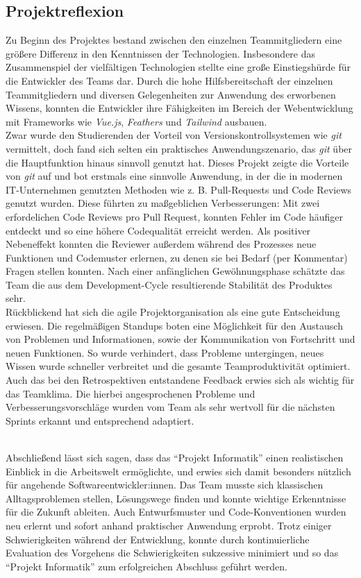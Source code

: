 \documentclass[10pt, a4paper]{article}
\begin{document}
\begin{onehalfspace}
\subsection{Projektreflexion}
Zu Beginn des Projektes bestand zwischen den einzelnen Teammitgliedern eine größere Differenz in den Kenntnissen der Technologien.
Insbesondere das Zusammenspiel der vielfältigen Technologien stellte eine große Einstiegshürde für die Entwickler des Teams dar.
Durch die hohe Hilfsbereitschaft der einzelnen Teammitgliedern und diversen Gelegenheiten zur Anwendung des erworbenen Wissens, konnten die Entwickler ihre Fähigkeiten im Bereich der Webentwicklung mit Frameworks wie \textit{Vue.js}, \textit{Feathers} und \textit{Tailwind} ausbauen.
$~$ \\
Zwar wurde den Studierenden der Vorteil von Versionskontrollsystemen wie \textit{git} vermittelt, doch fand sich selten ein praktisches Anwendungszenario, das \textit{git} über die Hauptfunktion hinaus sinnvoll genutzt hat.
Dieses Projekt zeigte die Vorteile von \textit{git} auf und bot erstmals eine sinnvolle Anwendung, in der die in modernen IT-Unternehmen genutzten Methoden wie z. B. Pull-Requests und Code Reviews genutzt wurden.
Diese führten zu maßgeblichen Verbesserungen:
Mit zwei erfordelichen Code Reviews pro Pull Request, konnten Fehler im Code häufiger entdeckt und so eine höhere Codequalität erreicht werden.
Als positiver Nebeneffekt konnten die Reviewer außerdem während des Prozesses neue Funktionen und Codemuster erlernen, zu denen sie bei Bedarf (per Kommentar) Fragen stellen konnten.
Nach einer anfänglichen Gewöhnungsphase schätzte das Team die aus dem Development-Cycle resultierende Stabilität des Produktes sehr.
\\
Rückblickend hat sich die agile Projektorganisation als eine gute Entscheidung erwiesen. Die regelmäßigen Standups boten eine Möglichkeit für den Austausch von Problemen und Informationen, sowie der Kommunikation von Fortschritt und neuen Funktionen.
So wurde verhindert, dass Probleme untergingen, neues Wissen wurde schneller verbreitet und die gesamte Teamproduktivität optimiert.
Auch das bei den Retrospektiven entstandene Feedback erwies sich als wichtig für das Teamklima.
Die hierbei angesprochenen Probleme und Verbesserungsvorschläge wurden vom Team als sehr wertvoll für die nächsten Sprints erkannt und entsprechend adaptiert.

$~$ \\
Abschließend lässt sich sagen, dass das \enquote{Projekt Informatik} einen realistischen Einblick in die Arbeitswelt ermöglichte, und erwies sich damit besonders nützlich für angehende Softwareentwickler:innen.
Das Team musste sich klassischen Alltagsproblemen stellen, Lösungswege finden und konnte wichtige Erkenntnisse für die Zukunft ableiten.
Auch Entwurfsmuster und Code-Konventionen wurden neu erlernt und sofort anhand praktischer Anwendung erprobt.
Trotz einiger Schwierigkeiten während der Entwicklung, konnte durch kontinuierliche Evaluation des Vorgehens die Schwierigkeiten sukzessive minimiert und so das \enquote{Projekt Informatik} zum erfolgreichen Abschluss geführt werden.


\end{onehalfspace}
\end{document}
